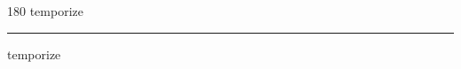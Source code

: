 
\begin{frame}
\begin{center}
\begin{turn}{180}
{\fontsize{2.5cm}{1em}\selectfont temporize}
\end{turn}
\vspace{1em}\par  
\hrule
\vspace{1em}\par  
{\fontsize{2.5cm}{1em}\selectfont temporize}
\end{center}
\end{frame}
